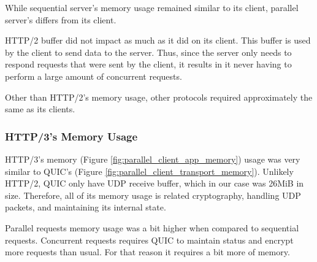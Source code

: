 While sequential server's memory usage remained similar to its client, parallel server's differs from its client.

HTTP/2 buffer did not impact as much as it did on its client. This buffer is used by the client to send data to the server. Thus, since the server only needs to respond requests that were sent by the client, it results in it never having to perform a large amount of concurrent requests.

Other than HTTP/2's memory usage, other protocols required approximately the same as its clients.

\subsubsection*{HTTP/3's Memory Usage}

HTTP/3's memory (Figure \ref{fig:parallel_client_app_memory}) usage was very similar to QUIC's (Figure \ref{fig:parallel_client_transport_memory}). Unlikely HTTP/2, QUIC only have UDP receive buffer, which in our case was 26MiB in size. Therefore, all of its memory usage is related cryptography, handling UDP packets, and maintaining its internal state.

Parallel requests memory usage was a bit higher when compared to sequential requests. Concurrent requests requires QUIC to maintain status and encrypt more requests than usual. For that reason it requires a bit more of memory.

\clearpage

